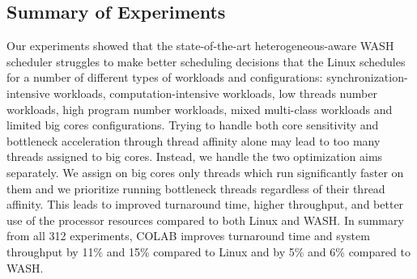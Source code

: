 \subsection{Summary of Experiments} Our experiments showed that the state-of-the-art heterogeneous-aware WASH scheduler struggles to make better scheduling decisions that the Linux schedules for a number of different types of workloads and configurations: synchronization-intensive workloads, computation-intensive workloads, low threads number workloads, high program number workloads, mixed multi-class workloads and limited big cores configurations. Trying to handle both core sensitivity and bottleneck acceleration through thread affinity alone may lead to too many threads assigned to big cores. Instead, we handle the two optimization aims separately. We assign on big cores only threads which run significantly faster on them and we prioritize running bottleneck threads regardless of their thread affinity. This leads to improved turnaround time, higher throughput, and better use of the processor resources compared to both Linux and WASH. In summary from all 312 experiments, 
COLAB improves turnaround time and system throughput by 11\% and 15\% compared to Linux and by 5\% and 6\% compared to WASH.


